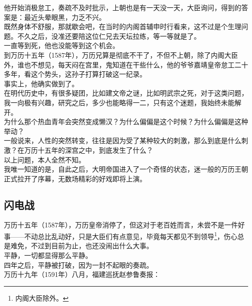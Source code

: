 \begin{multicols}{\theparacolNo}
他开始消极怠工，奏疏不及时批示，上朝也是有一天没一天，大臣询问，得到的答案是：最近头晕眼黑，力乏不兴。\\

既然身体不舒服，那就歇会吧，在当时的内阁首辅申时行看来，这不过是个生理问题。不久之后，没准还要陪这位仁兄去天坛拉练，等一等就是了。\\

一直等到死，他也没能等到这个机会。\\

到万历十五年（1587年），万历兄算是彻底不干了，不但不上朝，除了内阁大臣外，谁也不想见，每天闷在宫里，鬼知道在干些什么，他的爷爷嘉靖皇帝怠工二十多年，看这个势头，这孙子打算打破这一纪录。\\

事实上，他确实做到了。\\

在明代历史中，有很多疑团，比如建文帝之谜，比如明武宗之死，对于这类问题，我一向极有兴趣，研究之后，多少也能略得一二，只有这个迷题，我始终未能解开。\\

为什么那个热血青年会突然变成懒汉？为什么偏偏是这个时候？为什么偏偏是这种举动？\\

一般说来，人性的突然转变，往往是因为受了某种较大的刺激，那么到底是什么刺激？在万历十五年的深宫之中，到底发生了什么？\\

以上问题，本人全然不知。\\

我唯一知道的是，自此之后，大明帝国进入了一个奇怪的状态，迷一般的万历王朝正式拉开了序幕，无数场精彩的好戏即将上演。\\

\subsection{闪电战}
万历十五年（1587年），万历皇帝消停了，但这对于老百姓而言，未尝不是一件好事——不动总比乱动好，只是大臣们有点意见，毕竟每天都见不到领导\footnote{内阁大臣除外。}，伤心总是难免，不过到目前为止，也还没闹出什么大事。\\

平静，一切都显得那么平静。\\

四年之后，平静被打破，因为一封不起眼的奏疏。\\

万历十九年（1591年）八月，福建巡抚赵参鲁奏报：\\


\end{multicols}
